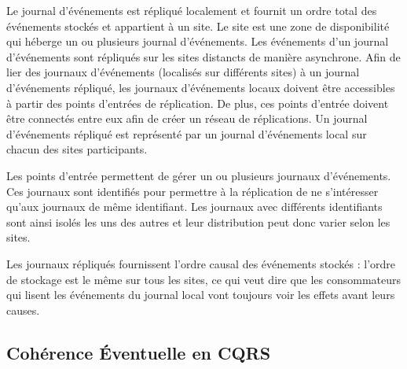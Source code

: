Le journal d'événements est répliqué localement et fournit un ordre total des 
événements stockés et appartient à un site. 
Le site est une zone de disponibilité qui héberge un ou plusieurs 
journal d'événements. Les événements d'un journal d'événements sont 
répliqués sur les sites distancts de manière asynchrone. 
Afin de lier des journaux d'événements (localisés sur différents sites) à un journal 
d'événements répliqué, les 
journaux d'événements locaux doivent être accessibles à partir des points 
d'entrées de réplication. De plus, ces points d'entrée doivent être 
connectés entre eux afin de créer un réseau de réplications. 
Un journal d'événements répliqué est représenté par un journal d'événements local 
sur chacun des sites participants.


Les points d'entrée permettent de gérer un ou plusieurs journaux d'événements. 
Ces journaux sont identifiés pour permettre à la réplication de ne s'intéresser 
qu'aux journaux de même identifiant. 
Les journaux avec différents identifiants sont ainsi isolés les uns des autres et 
leur distribution peut donc varier selon les sites.

Les journaux répliqués fournissent l'ordre causal des événements stockés : l'ordre 
de stockage est le même sur tous les sites, ce qui veut dire que les 
consommateurs qui lisent les événements du journal local vont toujours voir les 
effets avant leurs causes.



\subsection{Cohérence Éventuelle en CQRS}


